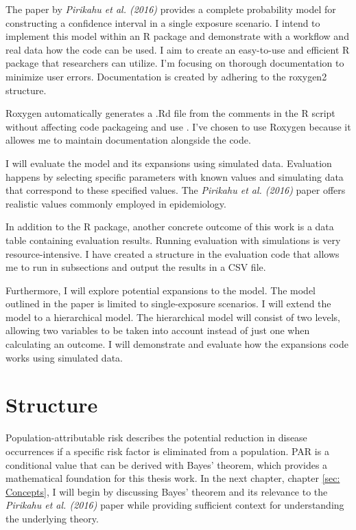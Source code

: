 The paper by \textit{Pirikahu et al. (2016)} provides a complete probability model for constructing a confidence interval in a single exposure scenario. I intend to implement this model within an R package and demonstrate with a workflow and real data how the code can be used. I aim to create an easy-to-use and efficient R package that researchers can utilize. I'm focusing on thorough documentation to minimize user errors. Documentation is created by adhering to the roxygen2 structure.

Roxygen automatically generates a .Rd file from the comments in the R script without affecting code packageing and use \cite{roxygen2}. I've chosen to use Roxygen because it allowes me to maintain documentation alongside the code.

I will evaluate the model and its expansions using simulated data. Evaluation happens by selecting specific parameters with known values and simulating data that correspond to these specified values. The \textit{Pirikahu et al. (2016)} paper offers realistic values commonly employed in epidemiology. 

In addition to the R package, another concrete outcome of this work is a data table containing evaluation results. Running evaluation with simulations is very resource-intensive. I have created a structure in the evaluation code that allows me to run in subsections and output the results in a CSV file.

Furthermore, I will explore potential expansions to the model. The model outlined in the paper is limited to single-exposure scenarios. I will extend the model to a hierarchical model. The hierarchical model will consist of two levels, allowing two variables to be taken into account instead of just one when calculating an outcome. I will demonstrate and evaluate how the expansions code works using simulated data.

\section{Structure} \label{sec:Structure}

Population-attributable risk describes the potential reduction in disease occurrences if a specific risk factor is eliminated from a population. PAR is a conditional value that can be derived with Bayes' theorem, which provides a mathematical foundation for this thesis work. In the next chapter, chapter \ref{sec: Concepts}, I will begin by discussing Bayes' theorem and its relevance to the \textit{Pirikahu et al. (2016)} paper while providing sufficient context for understanding the underlying theory.

